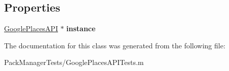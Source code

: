 \subsection*{Properties}
\begin{DoxyCompactItemize}
\item 
\hypertarget{interface_google_places_a_p_i_tests_a89fd9b4d599e74c1f90df5f1436a1605}{\hyperlink{interface_google_places_a_p_i}{Google\-Places\-A\-P\-I} $\ast$ {\bfseries instance}}\label{interface_google_places_a_p_i_tests_a89fd9b4d599e74c1f90df5f1436a1605}

\end{DoxyCompactItemize}


The documentation for this class was generated from the following file\-:\begin{DoxyCompactItemize}
\item 
Pack\-Manager\-Tests/Google\-Places\-A\-P\-I\-Tests.\-m\end{DoxyCompactItemize}
